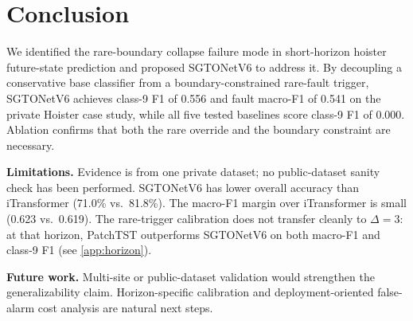\section{Conclusion}
\label{sec:conclusion}

We identified the rare-boundary collapse failure mode in short-horizon hoister future-state prediction and proposed SGTONetV6 to address it.
By decoupling a conservative base classifier from a boundary-constrained rare-fault trigger, SGTONetV6 achieves class-9 F1 of 0.556 and fault macro-F1 of 0.541 on the private Hoister case study, while all five tested baselines score class-9 F1 of 0.000.
Ablation confirms that both the rare override and the boundary constraint are necessary.

\textbf{Limitations.}
Evidence is from one private dataset; no public-dataset sanity check has been performed.
SGTONetV6 has lower overall accuracy than iTransformer (71.0\% vs.\ 81.8\%).
The macro-F1 margin over iTransformer is small (0.623 vs.\ 0.619).
The rare-trigger calibration does not transfer cleanly to $\Delta{=}3$: at that horizon, PatchTST outperforms SGTONetV6 on both macro-F1 and class-9 F1 (see \cref{app:horizon}).

\textbf{Future work.}
Multi-site or public-dataset validation would strengthen the generalizability claim.
Horizon-specific calibration and deployment-oriented false-alarm cost analysis are natural next steps.
